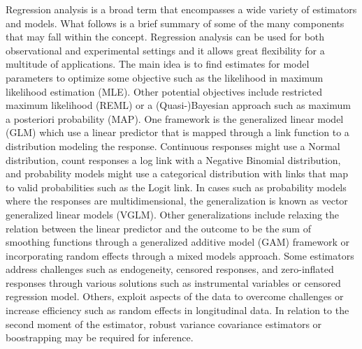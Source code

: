 \documentclass{juliacon}
\begin{document}
Regression analysis is a broad term that encompasses a wide variety of estimators and models. What follows is a brief summary of some of the many components that may fall within the concept. Regression analysis can be used for both observational and experimental settings and it allows great flexibility for a multitude of applications. The main idea is to find estimates for model parameters to optimize some objective such as the likelihood in maximum likelihood estimation (MLE). Other potential objectives include restricted maximum likelihood (REML) or a (Quasi-)Bayesian approach such as maximum a posteriori probability (MAP). One framework is the generalized linear model (GLM) which use a linear predictor that is mapped through a link function to a distribution modeling the response. Continuous responses might use a Normal distribution, count responses a log link with a Negative Binomial distribution, and probability models might use a categorical distribution with links that map to valid probabilities such as the Logit link. In cases such as probability models where the responses are multidimensional, the generalization is known as vector generalized linear models (VGLM). Other generalizations include relaxing the relation between the linear predictor and the outcome to be the sum of smoothing functions through a generalized additive model (GAM) framework or incorporating random effects through a mixed models approach. Some estimators address challenges such as endogeneity, censored responses, and zero-inflated responses through various solutions such as instrumental variables or censored regression model. Others, exploit aspects of the data to overcome challenges or increase efficiency such as random effects in longitudinal data. In relation to the second moment of the estimator, robust variance covariance estimators or boostrapping may be required for inference.
\end{document}
